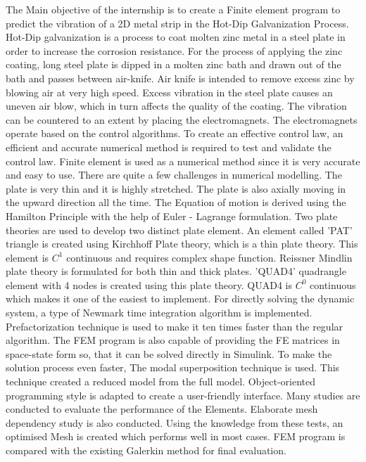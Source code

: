 \documentclass[12pt,twoside]{report}
\begin{document}
The Main objective of the internship is to create a Finite element program to predict the vibration of a 2D metal strip in the Hot-Dip Galvanization Process. Hot-Dip galvanization is a process to coat molten zinc metal in a steel plate in order to increase the corrosion resistance. For the process of applying the zinc coating, long steel plate is dipped in a molten zinc bath and drawn out of the bath and passes between air-knife. Air knife is intended to remove excess zinc by blowing air at very high speed. Excess vibration in the steel plate causes an uneven air blow, which in turn affects the quality of the coating. The vibration can be countered to an extent by placing the electromagnets. The electromagnets operate based on the control algorithms. To create an effective control law, an efficient and accurate numerical method is required to test and validate the control law. Finite element is used as a numerical method since it is very accurate and easy to use. There are quite a few challenges in numerical modelling. The plate is very thin and it is highly stretched. The plate is also axially moving in the upward direction all the time. The Equation of motion is derived using the Hamilton Principle with the help of Euler - Lagrange formulation. Two plate theories are used to develop two distinct plate element. An element called 'PAT' triangle is created using Kirchhoff Plate theory, which is a thin plate theory. This element is $C^1$ continuous and requires complex shape function. Reissner Mindlin plate theory is formulated for both thin and thick plates. 'QUAD4' quadrangle element with 4 nodes is created using this plate theory. QUAD4 is $C^0$ continuous which makes it one of the easiest to implement. For directly solving the dynamic system, a type of Newmark time integration algorithm is implemented.  Prefactorization technique is used to make it ten times faster than the regular algorithm. The FEM program is also capable of providing the FE matrices in space-state form so, that it can be solved directly in Simulink. To make the solution process even faster, The modal superposition technique is used. This technique created a reduced model from the full model. Object-oriented programming style is adapted to create a user-friendly interface. Many studies are conducted to evaluate the performance of the Elements. Elaborate mesh dependency study is also conducted.  Using the knowledge from these tests, an optimised Mesh is created which performs well in most cases. FEM program is compared with the existing Galerkin method for final evaluation.
\end{document}
